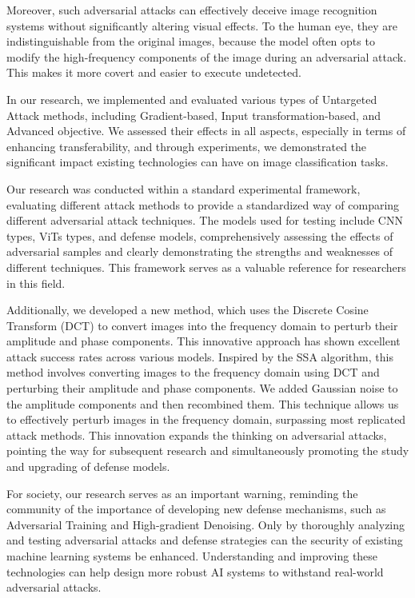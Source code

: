 Moreover, such adversarial attacks can effectively deceive image recognition systems without significantly altering visual effects. To the human eye, they are indistinguishable from the original images, because the model often opts to modify the high-frequency components of the image during an adversarial attack. This makes it more covert and easier to execute undetected.

In our research, we implemented and evaluated various types of Untargeted Attack methods, including Gradient-based, Input transformation-based, and Advanced objective. We assessed their effects in all aspects, especially in terms of enhancing transferability, and through experiments, we demonstrated the significant impact existing technologies can have on image classification tasks.

Our research was conducted within a standard experimental framework, evaluating different attack methods to provide a standardized way of comparing different adversarial attack techniques. The models used for testing include CNN types, ViTs types, and defense models, comprehensively assessing the effects of adversarial samples and clearly demonstrating the strengths and weaknesses of different techniques. This framework serves as a valuable reference for researchers in this field.

Additionally, we developed a new method, which uses the Discrete Cosine Transform (DCT) to convert images into the frequency domain to perturb their amplitude and phase components. This innovative approach has shown excellent attack success rates across various models. Inspired by the SSA algorithm, this method involves converting images to the frequency domain using DCT and perturbing their amplitude and phase components. We added Gaussian noise to the amplitude components and then recombined them. This technique allows us to effectively perturb images in the frequency domain, surpassing most replicated attack methods. This innovation expands the thinking on adversarial attacks, pointing the way for subsequent research and simultaneously promoting the study and upgrading of defense models.

For society, our research serves as an important warning, reminding the community of the importance of developing new defense mechanisms, such as Adversarial Training and High-gradient Denoising. Only by thoroughly analyzing and testing adversarial attacks and defense strategies can the security of existing machine learning systems be enhanced. Understanding and improving these technologies can help design more robust AI systems to withstand real-world adversarial attacks.

